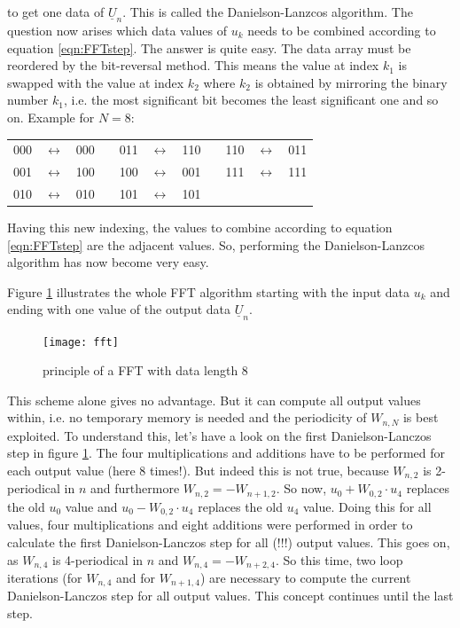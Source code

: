 to get one data of $\underline{U}_n$. This is called the
Danielson-Lanzcos algorithm.
The question now arises which data values of $u_k$
needs to be combined according to equation \eqref{eqn:FFTstep}.
The answer is quite easy. The data array must be reordered by the
bit-reversal method. This means the value at index $k_1$ is swapped
with the value at index $k_2$ where $k_2$ is obtained by mirroring
the binary number $k_1$, i.e. the most significant bit becomes the
least significant one and so on. Example for $N=8$:

\addvspace{12pt}

\begin{tabular}{ccccccccccc}
000 & $\leftrightarrow$ & 000  & \qquad\qquad &  011 & $\leftrightarrow$ & 110  & \qquad\qquad &  110 & $\leftrightarrow$ & 011 \\
001 & $\leftrightarrow$ & 100  & \qquad\qquad &  100 & $\leftrightarrow$ & 001  & \qquad\qquad &  111 & $\leftrightarrow$ & 111 \\
010 & $\leftrightarrow$ & 010  & \qquad\qquad &  101 & $\leftrightarrow$ & 101 \\
\end{tabular}

\addvspace{12pt}

Having this new indexing, the values to combine according to
equation \ref{eqn:FFTstep} are the adjacent values. So, performing
the Danielson-Lanzcos algorithm has now become very easy.

\addvspace{12pt}

Figure \ref{fig:fft} illustrates the whole FFT algorithm starting with the
input data $u_k$ and ending with one value of the output data
$\underline{U}_n$.

\begin{figure}[htb]
\begin{center}
\texttt{[image: fft]}
\end{center}
\caption{principle of a FFT with data length 8}
\label{fig:fft}
\end{figure}
\FloatBarrier

This scheme alone gives no advantage. But it can compute all output
values within, i.e. no temporary memory is needed and the periodicity
of $W_{n,N}$ is best exploited. To understand this, let's have a look
on the first Danielson-Lanczos step in figure \ref{fig:fft}. The four
multiplications and additions have to be performed for each output
value (here 8 times!). But indeed this is not true, because $W_{n,2}$
is 2-periodical in $n$ and furthermore $W_{n,2} = -W_{n+1,2}$. So now,
$u_0 + W_{0,2}\cdot u_4$ replaces the old $u_0$ value and
$u_0 - W_{0,2}\cdot u_4$ replaces the old $u_4$ value. Doing this for
all values, four multiplications and eight additions were performed
in order to calculate the first Danielson-Lanczos step for all (!!!)
output values. This goes on, as $W_{n,4}$ is 4-periodical in $n$ and
$W_{n,4} = -W_{n+2,4}$. So this time, two loop iterations (for $W_{n,4}$
and for $W_{n+1,4}$) are necessary to compute the current
Danielson-Lanczos step for all output values. This concept continues
until the last step.

